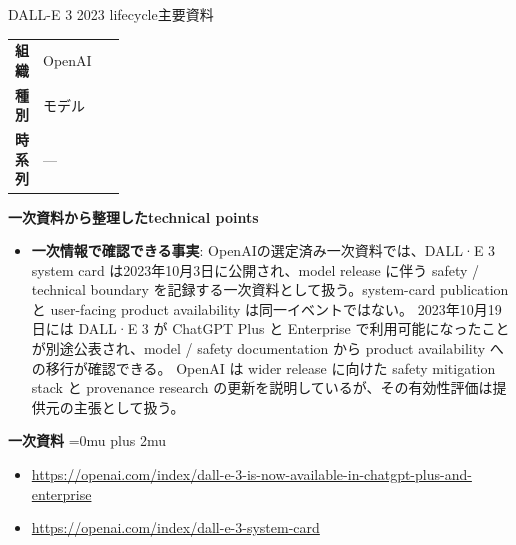 \begin{technicalnote}{DALL-E 3 2023 lifecycle}{主要資料}
\begingroup
\begin{tabularx}{\linewidth}{@{}>{\bfseries}p{0.22\linewidth}X@{}}
組織 & OpenAI \\
種別 & モデル \\
時系列 & — \\
\end{tabularx}
\smallskip
{\bfseries 一次資料から整理したtechnical points}
\begin{itemize}[leftmargin=1.5em,itemsep=0.35em]
\item \textbf{一次情報で確認できる事実}: OpenAIの選定済み一次資料では、DALL·E 3 system card は2023年10月3日に公開され、model release に伴う safety / technical boundary を記録する一次資料として扱う。system-card publication と user-facing product availability は同一イベントではない。 2023年10月19日には DALL·E 3 が ChatGPT Plus と Enterprise で利用可能になったことが別途公表され、model / safety documentation から product availability への移行が確認できる。 OpenAI は wider release に向けた safety mitigation stack と provenance research の更新を説明しているが、その有効性評価は提供元の主張として扱う。
\end{itemize}
\begin{minipage}{\linewidth}
\begin{samepage}
{\bfseries 一次資料}
\begingroup\sloppy
\Urlmuskip=0mu plus 2mu\relax
\begin{itemize}[leftmargin=1.5em,itemsep=0.25em]
\item {\scriptsize\url{https://openai.com/index/dall-e-3-is-now-available-in-chatgpt-plus-and-enterprise}}
\item {\scriptsize\url{https://openai.com/index/dall-e-3-system-card}}
\end{itemize}
\endgroup
\end{samepage}
\end{minipage}
\endgroup
\end{technicalnote}
\medskip

